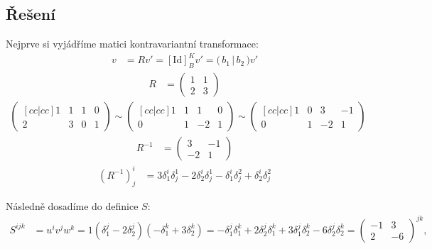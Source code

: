 \documentclass[]{article}
\newcommand{\Id}[2]{\ensuremath{[\mathrm{Id}]_{#1}^{#2}}}
\begin{document}
\subsection{Řešení}
Nejprve si vyjádříme matici kontravariantní transformace:
\begin{align*}
    v &= R v'
      = \Id{B}{K} v'
      = \big( \, b_1 \, \big| \, b_2 \, \big) v'
\end{align*}
\begin{align*}
    R &= \begin{pmatrix}
        1 & 1 \\
        2 & 3
    \end{pmatrix}
\end{align*}
\begin{align*}
    \begin{pmatrix}[cc|cc]
        1 & 1 & 1 & 0 \\
        2 & 3 & 0 & 1
    \end{pmatrix}
    \sim
    \begin{pmatrix}[cc|cc]
        1 & 1 & 1 & 0 \\
        0 & 1 & -2 & 1
    \end{pmatrix}
    \sim
    \begin{pmatrix}[cc|cc]
        1 & 0 & 3 & -1 \\
        0 & 1 & -2 & 1
    \end{pmatrix}
\end{align*}
\begin{align*}
    R^{-1} &= \begin{pmatrix}
        3 & -1 \\
        -2 & 1
    \end{pmatrix}
\end{align*}
\begin{align*}
    (R^{-1})^i_j &= 3 \delta^i_1 \delta_j^1 - 2 \delta^i_2 \delta_j^1
            -\delta^i_1 \delta_j^2 + \delta^i_2 \delta_j^2
\end{align*}

\medskip
\medskip

Následně dosadíme do definice $S$:
\begin{align*}
    S^{ijk} &= u^i v^j w^k
    = 1 (\delta_1^j - 2 \delta_2^j) (-\delta_1^k + 3 \delta_2^k)
    = -\delta_1^j \delta_1^k + 2 \delta_2^j \delta_1^k
    + 3 \delta_1^j \delta_2^k - 6 \delta_2^j \delta_2^k
    = \begin{pmatrix}
        -1 &  3 \\
         2 & -6
    \end{pmatrix}^{jk},
\end{align*}
\end{document}
